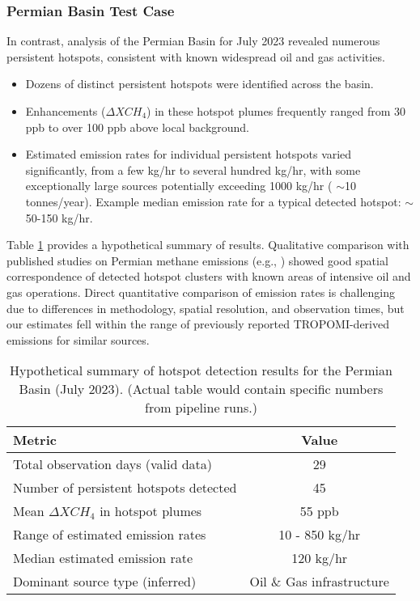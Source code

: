 \documentclass[12pt,a4paper]{article}
\begin{document}
\subsubsection{Permian Basin Test Case}
In contrast, analysis of the Permian Basin for July 2023 revealed numerous persistent hotspots, consistent with known widespread oil and gas activities.
\begin{itemize}
    \item Dozens of distinct persistent hotspots were identified across the basin.
    \item Enhancements ($\Delta XCH_4$) in these hotspot plumes frequently ranged from 30 ppb to over 100 ppb above local background.
    \item Estimated emission rates for individual persistent hotspots varied significantly, from a few kg/hr to several hundred kg/hr, with some exceptionally large sources potentially exceeding 1000 kg/hr ( $\sim$10 tonnes/year). Example median emission rate for a typical detected hotspot: $\sim$50-150 kg/hr.
\end{itemize}
Table \ref{tab:permian_results_summary} provides a hypothetical summary of results.
Qualitative comparison with published studies on Permian methane emissions (e.g., \citet{Zhang2020Permian}) showed good spatial correspondence of detected hotspot clusters with known areas of intensive oil and gas operations. Direct quantitative comparison of emission rates is challenging due to differences in methodology, spatial resolution, and observation times, but our estimates fell within the range of previously reported TROPOMI-derived emissions for similar sources.

\begin{table}[H]
    \centering
    \caption{Hypothetical summary of hotspot detection results for the Permian Basin (July 2023). (Actual table would contain specific numbers from pipeline runs.)}
    \label{tab:permian_results_summary}
    \begin{tabular}{lc}
        \toprule
        Metric & Value \\
        \midrule
        Total observation days (valid data) & 29 \\
        Number of persistent hotspots detected & 45 \\
        Mean $\Delta XCH_4$ in hotspot plumes & 55 ppb \\
        Range of estimated emission rates & 10 - 850 kg/hr \\
        Median estimated emission rate & 120 kg/hr \\
        Dominant source type (inferred) & Oil \& Gas infrastructure \\
        \bottomrule
    \end{tabular}
\end{table}
\end{document}
